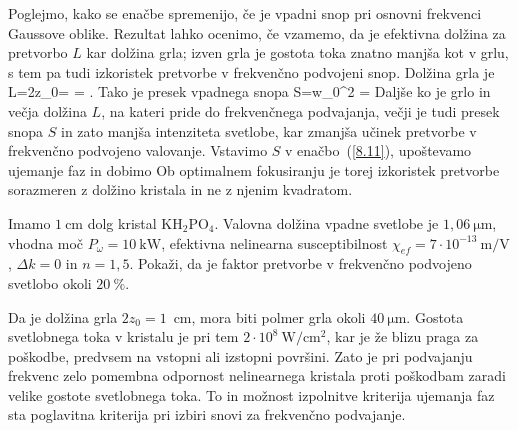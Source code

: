 Poglejmo, kako se enačbe spremenijo, če je vpadni snop pri osnovni 
frekvenci Gaussove oblike. 
Rezultat lahko ocenimo, če vzamemo, da je
efektivna dolžina za pretvorbo $L$ kar dolžina grla; izven grla je 
gostota toka znatno manjša kot v grlu, s tem pa tudi izkoristek pretvorbe v 
frekvenčno podvojeni snop.
Dolžina grla je 
\beq
L=2z_{0}= = .
\label{SHGG}
\eeq
Tako je presek vpadnega snopa
\beq
S=\pi w_{0}^{2} = 
\eeq
Daljše ko je grlo in večja dolžina $L$, na kateri pride do frekvenčnega podvajanja, 
večji je tudi presek snopa $S$ in zato manjša intenziteta svetlobe, kar zmanjša
učinek pretvorbe v frekvenčno podvojeno valovanje.
Vstavimo $S$ v enačbo~(\ref{8.11}), upoštevamo ujemanje faz in dobimo 
Ob optimalnem fokusiranju je torej izkoristek pretvorbe sorazmeren z 
dolžino kristala in ne z njenim kvadratom.

\begin{definition}
Imamo $1~\si{\centi\metre}$ dolg kristal KH$_{2}$PO$_{4}$. Valovna dolžina vpadne svetlobe 
je $1,06~\si{\micro\metre}$, vhodna moč $P_\omega = 10~\si{\kilo\watt}$, efektivna nelinearna susceptibilnost
$\chi_{ef}=7\cdot10^{-13}~\si{\metre/\volt}$, $\Delta k=0$ in $n=1,5$. Pokaži, da je
faktor pretvorbe v frekvenčno podvojeno svetlobo okoli $20~\%$.

Da je dolžina grla $2z_{0}=1$~cm, mora biti polmer
grla okoli $40~\si{\micro\metre}$. Gostota svetlobnega toka v kristalu je pri
tem $2\cdot10^{8}~\si{\watt/\centi\metre^{2}}$, kar je že blizu praga za poškodbe,
predvsem na vstopni ali izstopni površini. Zato je pri podvajanju frekvenc
zelo pomembna odpornost nelinearnega kristala proti poškodbam
zaradi velike gostote svetlobnega toka. To in možnost izpolnitve kriterija ujemanja 
faz sta poglavitna kriterija pri izbiri snovi za frekvenčno podvajanje. 
\end{definition}

